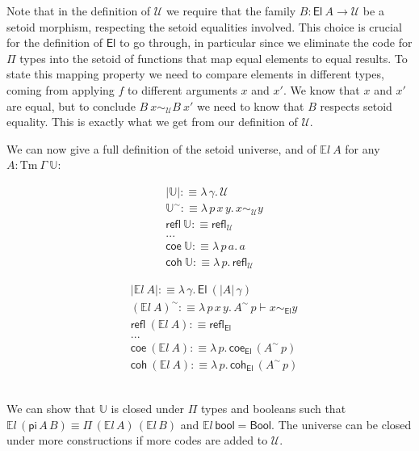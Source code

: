 \documentclass[a4paper,UKenglish,cleveref, autoref, thm-restate]{lipics-v2019}
\newcommand{\GG}{\Gamma}
\newcommand{\setoidU}{\mathcal{U}}
\newcommand{\Tm}{\mathrm{Tm}}
\newcommand{\El}{\textsf{El}}
\newcommand{\Uty}{\mathds{U}}
\newcommand{\EL}{\mathds{E}l}
\newcommand{\reflu}{\textsf{refl}_\setoidU}
\newcommand{\reflel}{\textsf{refl}_\El}
\newcommand{\equ}[2]{#1 \sim_\setoidU #2}
\newcommand{\eqel}[3]{#1 \vdash #2 \sim_\El #3}
\begin{document}
Note that in the definition of $\setoidU$ we require that the family $B : \El\ A
\to \setoidU$ be a setoid morphism, respecting the setoid equalities involved.
%
This choice is crucial for the definition of $\El$ to go through, in particular
since we eliminate the code for $\Pi$ types into the setoid of functions that
map equal elements to equal results. To state this mapping property we need to
compare elements in different types, coming from applying $f$ to different
arguments $x$ and $x'$. We know that $x$ and $x'$ are equal, but to conclude
$\equ{B\ x}{B\ x'}$ we need to know that $B$ respects setoid equality. This is
exactly what we get from our definition of $\setoidU$.

We can now give a full definition of the setoid universe, and of $\EL\ A$ for
any $A : \Tm\ \GG\ \Uty$: \\
%
\begin{minipage}{0.5\textwidth}
\begin{align*}
  & | \Uty | :\equiv \lambda\, \gamma . \, \setoidU \\
  & \Uty^\sim :\equiv \lambda \,p\, x\, y . \,x \sim_{\setoidU} y \\
  & \textsf{refl}\ \Uty :\equiv \reflu \\
  & ... \\
  & \textsf{coe}\ \Uty :\equiv \lambda\,p\,a . \, a \\
  & \textsf{coh}\ \Uty :\equiv \lambda\,p . \, \reflu
\end{align*}
\end{minipage}
\begin{minipage}{0.5\textwidth}
\begin{align*}
  & | \EL\ A | :\equiv \lambda \, \gamma . \, \El\ (| A | \,\gamma) \\
  & (\EL\ A)^\sim :\equiv \lambda \, p \, x \, y . \, \eqel{A^\sim\,p}{x}{y} \\
  & \textsf{refl}\ (\EL\ A) :\equiv \reflel \\
  & ... \\
  & \textsf{coe}\ (\EL\ A) :\equiv \lambda\,p.\, \textsf{coe}_{\El}\,(A^\sim\,p) \\
  & \textsf{coh}\ (\EL\ A) :\equiv \lambda\,p.\, \textsf{coh}_{\El}\,(A^\sim\,p)
\end{align*}
\end{minipage}
\\

We can show that $\Uty$ is closed under $\Pi$ types and booleans such
that $\EL\,(\mathsf{pi}\,A\,B) \equiv \Pi\,(\EL\,A)\,(\EL\,B)$ and
$\EL\,\mathsf{bool} = \mathsf{Bool}$. The universe can be closed under
more constructions if more codes are added to $\setoidU$.
\end{document}
